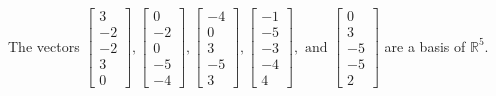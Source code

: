 \begin{exercise}
\begin{exerciseStatement}
  \end{exerciseStatement}
  \begin{exerciseAnswer}
   The vectors \(\left[\begin{array}{r}
3 \\
-2 \\
-2 \\
3 \\
0
\end{array}\right] , \left[\begin{array}{r}
0 \\
-2 \\
0 \\
-5 \\
-4
\end{array}\right] , \left[\begin{array}{r}
-4 \\
0 \\
3 \\
-5 \\
3
\end{array}\right] , \left[\begin{array}{r}
-1 \\
-5 \\
-3 \\
-4 \\
4
\end{array}\right] , \text{ and } \left[\begin{array}{r}
0 \\
3 \\
-5 \\
-5 \\
2
\end{array}\right]\) 
  	 are  a basis of \(\mathbb{R}^5\).
  


  \end{exerciseAnswer}
\end{exercise}